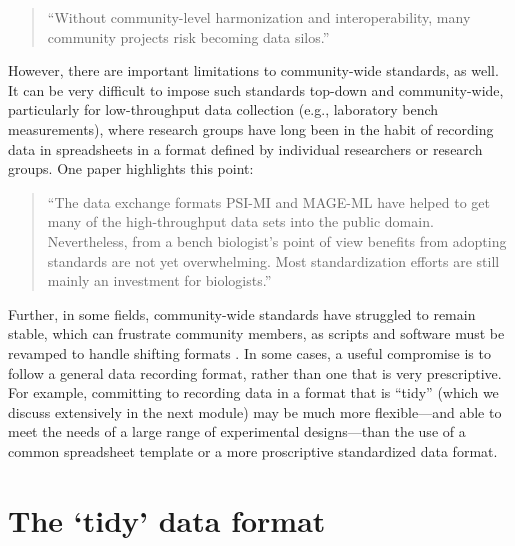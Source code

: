 \documentclass[]{tufte-book}
\begin{document}
\begin{quote}
``Without community-level harmonization and interoperability, many community
projects risk becoming data silos.'' \citep{sansone2012toward}
\end{quote}

However, there are important limitations to community-wide standards, as well.
It can be very difficult to impose such standards top-down and community-wide,
particularly for low-throughput data collection (e.g., laboratory bench
measurements), where research groups have long been in the habit of recording
data in spreadsheets in a format defined by individual researchers or research
groups. One paper highlights this point:

\begin{quote}
``The data exchange formats PSI-MI and MAGE-ML have helped to get many of the
high-throughput data sets into the public domain. Nevertheless, from a bench
biologist's point of view benefits from adopting standards are not yet
overwhelming. Most standardization efforts are still mainly an investment for
biologists.'' \citep{brazma2006standards}
\end{quote}

Further, in some fields, community-wide standards have struggled to remain
stable, which can frustrate community members, as scripts and software must be
revamped to handle shifting formats \citep{buffalo2015bioinformatics, barga2011bioinformatics}. In some cases, a useful compromise is to follow a
general data recording format, rather than one that is very prescriptive. For
example, committing to recording data in a format that is ``tidy'' (which we
discuss extensively in the next module) may be much more flexible---and able to
meet the needs of a large range of experimental designs---than the use of a
common spreadsheet template or a more proscriptive standardized data format.

\section{The `tidy' data format}\label{module3}
\end{document}
